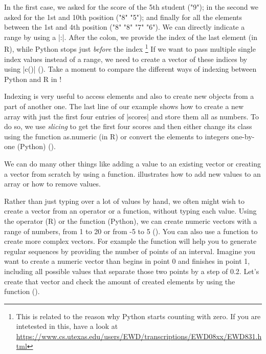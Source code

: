 In the first case, we asked for the score of the 5th student ("9");
in the second we asked for the 1st and 10th position ("8" "5"); and
finally for all the elements between the 1st and 4th position ("8"
"8" "7" "6"). We can directly indicate a range
by using a |:|. After the colon, we provide the index of
the last element (in R), while Python stops just \emph{before} the index
\footnote{This is related to the
reason why Python starts counting with zero. If you are intetested
in this, have a look at \url{https://www.cs.utexas.edu/users/EWD/transcriptions/EWD08xx/EWD831.html}}
If we want to pass multiple single index values instead of a range,
we need to create a vector of these indices by using |c()| ().
Take a moment to compare the different ways of indexing between Python
and R in !



Indexing is very useful to access elements and also to
create new objects from a part of another one. The last line of our
example shows how to create a new array with just the first four
entries of |scores| and store them all as numbers. To do so, we
use \emph{slicing} to get the first four scores and then either change its class using the function
as.numeric (in R) or convert the elements to integers one-by-one (Python)  ().



We can do many other things like adding a value to an existing vector
or creating a vector from scratch by using a
function.  illustrates how to add new values to an array
or how to remove values. 

Rather than just typing over a lot of values by hand, we often might
wish to create a vector from an operator or a function, without typing
each value. Using the operator \fn{:} (R) or the function  (Python), we can create numeric vectors with
a range of numbers, from 1 to 20 or from -5 to 5 ().
You can also use a function to create more complex vectors. For
example the function  will help you to generate regular sequences
by providing the number of points of an interval.  Imagine you want to
create a numeric vector than begins in point 0 and finishes in point
1, including all possible values that separate those two points by a
step of 0.2. Let's create that vector and check the amount of created
elements by using the function  ().








